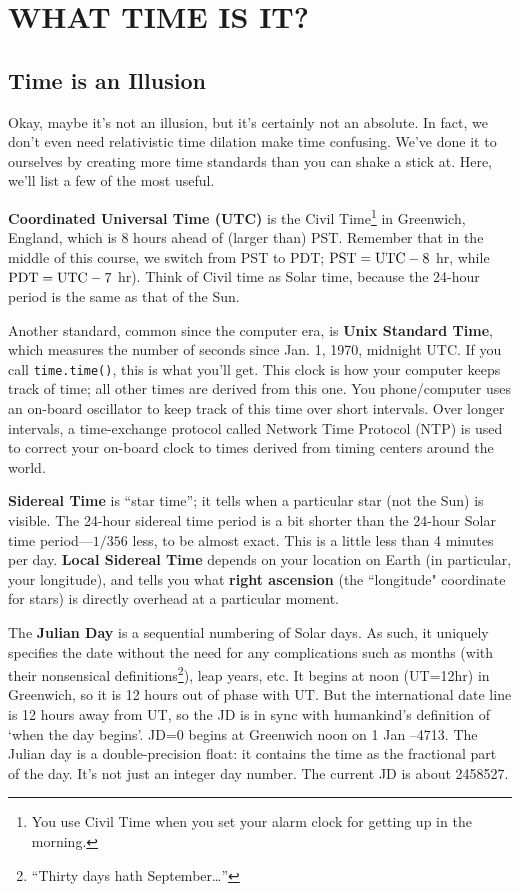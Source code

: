 \documentclass[11pt,preprint]{aastex}
\begin{document}
\section{WHAT TIME IS IT?} \label{jultime}

\subsection{Time is an Illusion}

Okay, maybe it's not an illusion, but it's certainly not an absolute.
In fact, we don't even need relativistic time dilation make time confusing.
We've done it to ourselves by creating more time standards than you can
shake a stick at.  Here, we'll list a few of the most useful.

{\bf Coordinated Universal Time (UTC)} is the Civil Time\footnote{You use
  Civil Time when you set your alarm clock for getting up in the
  morning.} in Greenwich, England, which is 8 hours ahead of (larger
than) PST. Remember that in the middle of this course, we switch from
PST to PDT; ${\rm PST}={\rm UTC} - 8$ hr, while ${\rm PDT}={\rm UTC} - 7$ hr). Think of Civil time
as Solar time, because the 24-hour period is the same as that of the
Sun.

Another standard, common since the computer era, is {\bf Unix Standard Time}, which measures the
number of seconds since Jan. 1, 1970, midnight UTC. If you call {\tt time.time()}, this
is what you'll get.  This clock is how your computer keeps track of time; all other times
are derived from this one.  You phone/computer uses an on-board oscillator to keep track of 
this time over short intervals.  Over longer intervals, a time-exchange protocol called 
Network Time Protocol (NTP) is used to correct your on-board clock to times derived from timing
centers around the world.

{\bf Sidereal Time} is ``star time''; it tells when a
particular star (not the Sun) is visible. The 24-hour sidereal time period is a
bit shorter than the 24-hour Solar time period---$1/356$ less, to
be almost exact. This is a little less than 4 minutes per day.  {\bf Local Sidereal Time}
depends on your location on Earth (in particular, your longitude), and tells you
what {\bf right ascension} (the ``longitude" coordinate for stars) is directly overhead
at a particular moment.

The {\bf Julian Day} is a sequential numbering of Solar days. As such, it
uniquely specifies the date without the need for any complications such
as months (with their nonsensical definitions\footnote{``Thirty days
  hath September\dots''}), leap years, etc. It begins at noon (UT=12hr)
in Greenwich, so it is 12 hours out of phase with UT. But the
international date line is 12 hours away from UT, so the JD is in sync
with humankind's definition of `when the day begins'. JD=0 begins at
Greenwich noon on 1 Jan --4713.  The Julian day is a double-precision
float: it contains the time as the fractional part of the day. It's not
just an integer day number. The current JD is about 
2458527. %
\end{document}
